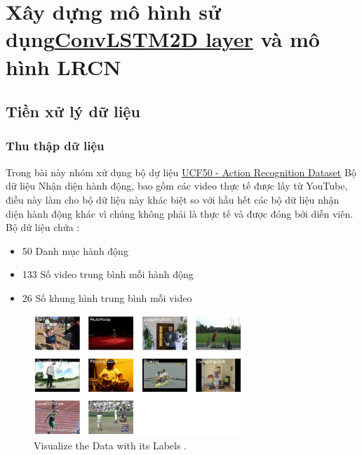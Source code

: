 \newpage

\section{Xây dựng mô hình sử dụng\href{https://keras.io/api/layers/recurrent_layers/conv_lstm2d/}{ConvLSTM2D layer} và mô hình LRCN}
\subsection{Tiền xử lý dữ liệu}


\subsubsection{Thu thập dữ liệu }

    Trong bài này nhóm xử dụng bộ dự liệu \href{https://www.crcv.ucf.edu/data/UCF50.php}{UCF50 - Action Recognition Dataset}
Bộ dữ liệu Nhận diện hành động, bao gồm các video thực tế được lấy từ YouTube, điều này làm cho bộ dữ liệu này khác biệt so với hầu hết các bộ dữ liệu nhận diện hành động khác vì chúng không phải là thực tế và được đóng bởi diễn viên. Bộ dữ liệu chứa :

\begin{itemize}
    \item 50 Danh mục hành động
    \item 133 Số video trung bình mỗi hành động
    \item 26 Số khung hình trung bình mỗi video
\end{itemize}


\begin{figure}[h!]
	\centering
	\includegraphics[width=0.7\textwidth]{Figures/datashow.png}
	\caption[Visualize the Data with its Labels.]{Visualize the Data with its Labels .}
	\label{datashow.png} 
    \end{figure}
    \newpage
